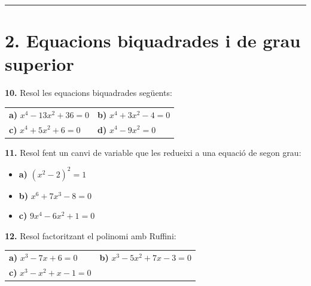 \documentclass[13pt,a4paper]{extarticle}
\begin{document}
\vspace{1mm}\hrule\vspace{3mm}

\section*{2. Equacions biquadrades i de grau superior}

\par\noindent\begin{minipage}{\linewidth}
\textbf{10.} Resol les equacions biquadrades següents:\par


\begin{tabular}{@{}p{.46\linewidth}p{.46\linewidth}@{}}
\textbf{a)} $x^4-13x^2+36=0$ & \textbf{b)} $x^4+3x^2-4=0$ \\[3pt]
\textbf{c)} $x^4+5x^2+6=0$ & \textbf{d)} $x^4-9x^2=0$ \\[3pt]
\end{tabular}\par
\end{minipage}\par\vspace{1.6mm}
\par\noindent\begin{minipage}{\linewidth}
\textbf{11.} Resol fent un canvi de variable que les redueixi a una equació de segon grau:\par

\begin{itemize}[leftmargin=0pt,itemsep=6pt,topsep=4pt,parsep=0pt,label={}]
\item \textbf{a)} $(x^2-2)^2=1$
\item \textbf{b)} $x^6+7x^3-8=0$
\item \textbf{c)} $9x^4-6x^2+1=0$
\end{itemize}
\end{minipage}\par\vspace{1.6mm}
\par\noindent\begin{minipage}{\linewidth}
\textbf{12.} Resol factoritzant el polinomi amb Ruffini:\par


\begin{tabular}{@{}p{.46\linewidth}p{.46\linewidth}@{}}
\textbf{a)} $x^3-7x+6=0$ & \textbf{b)} $x^3-5x^2+7x-3=0$ \\[3pt]
\textbf{c)} $x^3-x^2+x-1=0$ &  \\[3pt]
\end{tabular}\par
\end{minipage}\par\vspace{1.6mm}
\end{document}
